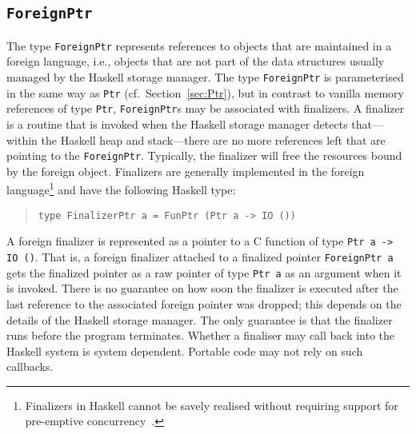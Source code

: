 \documentclass[a4paper,twoside]{article}
\newcommand{\code}[1]{\texttt{#1}}      %
\begin{document}
\subsection{\code{ForeignPtr}}
\label{sec:ForeignPtr}

The type \code{ForeignPtr} represents references to objects that are
maintained in a foreign language, i.e., objects that are not part of the data
structures usually managed by the Haskell storage manager.  The type
\code{ForeignPtr} is parameterised in the same way as \code{Ptr} (cf.\ 
Section~\ref{sec:Ptr}), but in contrast to vanilla memory references of type
\code{Ptr}, \code{ForeignPtr}s may be associated with finalizers.  A finalizer
is a routine that is invoked when the Haskell storage manager detects
that---within the Haskell heap and stack---there are no more references left
that are pointing to the \code{ForeignPtr}.  Typically, the finalizer will
free the resources bound by the foreign object.  Finalizers are generally
implemented in the foreign language\footnote{Finalizers in Haskell cannot be
  savely realised without requiring support for pre-emptive
  concurrency~\cite{boehm:finalizers}.} and have the following Haskell type:
%
\begin{quote}
\begin{verbatim}
type FinalizerPtr a = FunPtr (Ptr a -> IO ())
\end{verbatim}
\end{quote}
%
A foreign finalizer is represented as a pointer to a C function of type
\code{Ptr a -> IO ()}.  That is, a foreign finalizer attached to a finalized
pointer \code{ForeignPtr a} gets the finalized pointer as a raw pointer of
type \code{Ptr a} as an argument when it is invoked.  There is no guarantee on
how soon the finalizer is executed after the last reference to the associated
foreign pointer was dropped; this depends on the details of the Haskell
storage manager.  The only guarantee is that the finalizer runs before the
program terminates.  Whether a finaliser may call back into the Haskell system
is system dependent.  Portable code may not rely on such callbacks.
\end{document}
